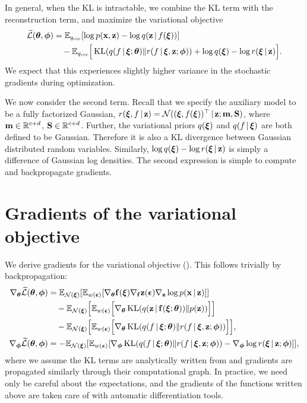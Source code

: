 In general, when the KL is intractable,
we combine the KL term with the reconstruction term, and maximize the
variational objective
\begin{align}
\begin{split}
\widetilde{\cL}(\mbtheta,\mbphi)
&
=
\mathbb{E}_{\qvgp}[\log p(\mbx,\mbz) - \log q(\mbz\g f(\mbxi))]
\\
&
\quad
-
\mathbb{E}_{\qvgp}\Big[
\operatorname{KL}(q(f\g\mbxi;\mbtheta)\|r(f\g\mbxi,\mbz;\mbphi))
+
\log q(\mbxi) - \log r(\mbxi\g\mbz)
\Big].
\end{split}
\label{eq:general_vgp_bound}
\end{align}
We expect that this experiences slightly higher variance in the
stochastic gradients during optimization.

We now consider the second term.
Recall that we specify the auxiliary model to be a fully factorized
Gaussian,
$r(\mbxi,f\g\mbz) = \mathcal{N}((\mbxi,f(\mbxi))^\top\g\mbz; \m,\S)$,
where $\m\in\mathbb{R}^{c+d}$, $\S\in\mathbb{R}^{c+d}$. Further, the
variational priors $q(\mbxi)$ and $q(f\g\mbxi)$ are both defined to be
Gaussian. Therefore it is also a KL
divergence between Gaussian distributed
random variables. Similarly, $\log q(\mbxi) - \log r(\mbxi\g\mbz)$ is
simply a difference of Gaussian log densities.
The second expression is simple to compute and backpropagate gradients.

\section{Gradients of the variational objective}
\label{appendix:gradients}

We derive gradients for the variational objective
(). This follows trivially by backpropagation:
\begin{align*}
\nabla_{\mbtheta}
\widetilde{\cL}(\mbtheta, \mbphi)
&=
\mathbb{E}_{\mathcal{N}(\mbxi)}[
\mathbb{E}_{w(\mbepsilon)}[
\nabla_{\mbtheta} \f(\mbxi)\nabla_{\f}\mbz(\mbepsilon)\nabla_{\mbz}
\log p(\mbx\g\mbz)
]]
\\
&\quad
-
\mathbb{E}_{\mathcal{N}(\mbxi)}\Big[\mathbb{E}_{w(\mbepsilon)}\Big[
\nabla_{\mbtheta}
\operatorname{KL}(q(\mbz\g \f(\mbxi;\mbtheta))\|p(\mbz))
\Big]\Big]
\\
&\quad
-
\mathbb{E}_{\mathcal{N}(\mbxi)}\Big[\mathbb{E}_{w(\mbepsilon)}\Big[
\nabla_{\mbtheta}
\operatorname{KL}(q(f\g\mbxi;\mbtheta)\|r(f\g\mbxi,\mbz;\mbphi))
\Big]\Big]
,
\\
\nabla_{\mbphi}
\widetilde{\cL}(\mbtheta, \mbphi)
&=
-
\mathbb{E}_{\mathcal{N}(\mbxi)}[\mathbb{E}_{w(\mbepsilon)}[
\nabla_{\mbphi}
\operatorname{KL}(q(f\g\mbxi;\mbtheta)\|r(f\g\mbxi,\mbz;\mbphi))
-
\nabla_{\mbphi}
\log r(\mbxi\g\mbz; \mbphi)
]
],
\end{align*}
where we assume the KL terms are analytically written from
 and gradients are propagated similarly through their
computational graph.
In practice, we need only be
careful about the expectations, and the gradients of the functions
written above are taken care of with automatic differentiation tools.

